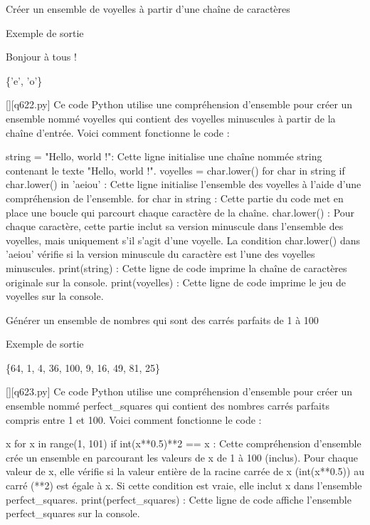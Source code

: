         \question
        Créer un ensemble de voyelles à partir d'une chaîne de caractères

Exemple de sortie

Bonjour à tous !

\{'e', 'o'\}
        \par
        \begin{solution}
            \renewcommand{\nomfichier}{q622.py}
            \pythonfile{\chemincode \nomfichier}[][\nomfichier]
            Ce code Python utilise une compréhension d'ensemble pour créer un ensemble nommé voyelles qui contient des voyelles minuscules à partir de la chaîne d'entrée. Voici comment fonctionne le code :

    string = "Hello, world !": Cette ligne initialise une chaîne nommée string contenant le texte "Hello, world !".
    voyelles = {char.lower() for char in string if char.lower() in 'aeiou'} : Cette ligne initialise l'ensemble des voyelles à l'aide d'une compréhension de l'ensemble.
        for char in string : Cette partie du code met en place une boucle qui parcourt chaque caractère de la chaîne.
        {char.lower()} : Pour chaque caractère, cette partie inclut sa version minuscule dans l'ensemble des voyelles, mais uniquement s'il s'agit d'une voyelle. La condition char.lower() dans 'aeiou' vérifie si la version minuscule du caractère est l'une des voyelles minuscules.
    print(string) : Cette ligne de code imprime la chaîne de caractères originale sur la console.
    print(voyelles) : Cette ligne de code imprime le jeu de voyelles sur la console.
        \end{solution}
        

        \question
        Générer un ensemble de nombres qui sont des carrés parfaits de 1 à 100

Exemple de sortie

\{64, 1, 4, 36, 100, 9, 16, 49, 81, 25\}
        \par
        \begin{solution}
            \renewcommand{\nomfichier}{q623.py}
            \pythonfile{\chemincode \nomfichier}[][\nomfichier]
            Ce code Python utilise une compréhension d'ensemble pour créer un ensemble nommé perfect_squares qui contient des nombres carrés parfaits compris entre 1 et 100. Voici comment fonctionne le code :

    {x for x in range(1, 101) if int(x**0.5)**2 == x} : Cette compréhension d'ensemble crée un ensemble en parcourant les valeurs de x de 1 à 100 (inclus). Pour chaque valeur de x, elle vérifie si la valeur entière de la racine carrée de x (int(x**0.5)) au carré (**2) est égale à x. Si cette condition est vraie, elle inclut x dans l'ensemble perfect_squares.
    print(perfect_squares) : Cette ligne de code affiche l'ensemble perfect_squares sur la console.
        \end{solution}
        

